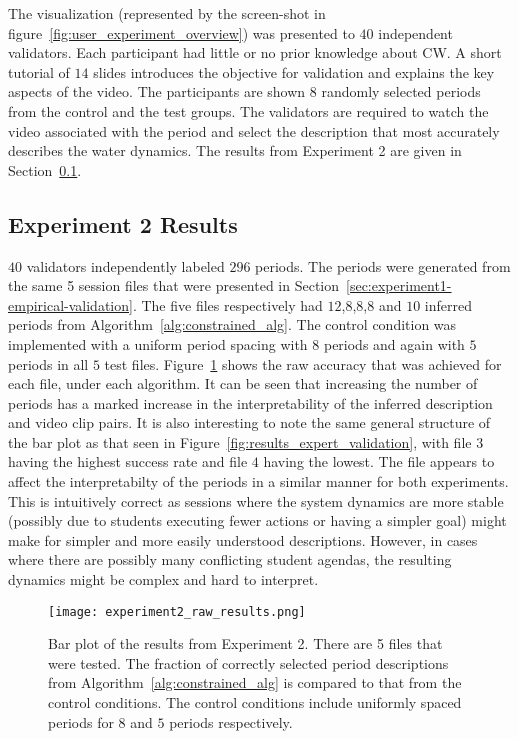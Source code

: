 The visualization (represented by the screen-shot in figure~\ref{fig:user_experiment_overview}) was presented to $40$ independent validators. Each participant had little or no prior knowledge about CW. A short tutorial of $14$ slides introduces the objective for validation and explains the key aspects of the video. The participants are shown $8$ randomly selected periods from the control and the test groups. The validators are required to watch the video associated with the period and select the description that most accurately describes the water dynamics. The results from Experiment 2 are given in Section~\ref{sec:experiment2-empirical-validation-results}.

\subsection{Experiment 2 Results}\label{sec:experiment2-empirical-validation-results}

$40$ validators independently labeled $296$ periods. The periods were generated from the same 5 session files that were presented in Section~\ref{sec:experiment1-empirical-validation}. The five files respectively had $12$,$8$,$8$,$8$ and $10$ inferred periods from Algorithm~\ref{alg:constrained_alg}. The control condition was implemented with a uniform period spacing with $8$ periods and again with $5$ periods in all $5$ test files. Figure~\ref{fig:experiment2_raw_results} shows the raw accuracy that was achieved for each file, under each algorithm. It can be seen that increasing the number of periods has a marked increase in the interpretability of the inferred description and video clip pairs. It is also interesting to note the same general structure of the bar plot as that seen in Figure~\ref{fig:results_expert_validation}, with file $3$ having the highest success rate and file $4$ having the lowest. The file appears to affect the interpretabilty of the periods in a similar manner for both experiments. This is intuitively correct as sessions where the system dynamics are more stable (possibly due to students executing fewer actions or having a simpler goal) might make for simpler and more easily understood descriptions. However, in cases where there are possibly many conflicting student agendas, the resulting dynamics might be complex and hard to interpret.

\begin{figure}
\centering
\texttt{[image: experiment2\_raw\_results.png]}
\caption{Bar plot of the results from Experiment 2. There are 5 files that were tested. The fraction of correctly selected period descriptions from Algorithm~\ref{alg:constrained_alg} is compared to that from the control conditions. The control conditions include uniformly spaced periods for $8$ and $5$ periods respectively.}
\label{fig:experiment2_raw_results}
\end{figure}

